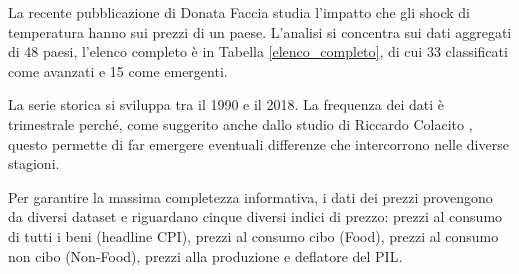 La recente pubblicazione di Donata Faccia studia l'impatto che gli shock di temperatura hanno sui prezzi di un paese. L'analisi si concentra sui dati aggregati di 48 paesi, l'elenco completo è in Tabella \ref{elenco_completo}, di cui 33 classificati come avanzati e 15 come emergenti.

La serie storica si sviluppa tra il 1990 e il 2018. La frequenza dei dati è trimestrale perché, come suggerito anche dallo studio di Riccardo Colacito \parencite{Colacito:temp}, questo permette di far emergere eventuali differenze che intercorrono nelle diverse stagioni.

Per garantire la massima completezza informativa, i dati dei prezzi provengono da diversi dataset e riguardano cinque diversi indici di prezzo: prezzi al consumo di tutti i beni (headline CPI), prezzi al consumo cibo (Food), prezzi al consumo non cibo (Non-Food), prezzi alla produzione e deflatore del PIL.

